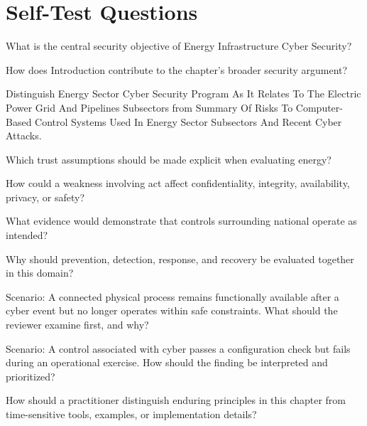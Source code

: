 \documentclass[11pt,letterpaper]{article}
\begin{document}
\section*{Self-Test Questions}
\begin{CornellRecallList}
\item What is the central security objective of Energy Infrastructure Cyber Security?
\item How does Introduction contribute to the chapter's broader security argument?
\item Distinguish Energy Sector Cyber Security Program As It Relates To The Electric Power Grid And Pipelines Subsectors from Summary Of Risks To Computer-Based Control Systems Used In Energy Sector Subsectors And Recent Cyber Attacks.
\item Which trust assumptions should be made explicit when evaluating energy?
\item How could a weakness involving act affect confidentiality, integrity, availability, privacy, or safety?
\item What evidence would demonstrate that controls surrounding national operate as intended?
\item Why should prevention, detection, response, and recovery be evaluated together in this domain?
\item Scenario: A connected physical process remains functionally available after a cyber event but no longer operates within safe constraints. What should the reviewer examine first, and why?
\item Scenario: A control associated with cyber passes a configuration check but fails during an operational exercise. How should the finding be interpreted and prioritized?
\item How should a practitioner distinguish enduring principles in this chapter from time-sensitive tools, examples, or implementation details?
\end{CornellRecallList}
\end{document}
